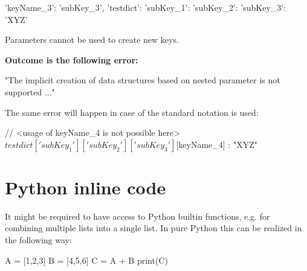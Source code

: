 \begin{pythonlog}
{'keyName_3': 'subKey_3',
 'testdict': {'subKey_1': {'subKey_2': {'subKey_3': 'XYZ'}}}}
\end{pythonlog}

\vspace{2ex}

Parameters cannot be used to create new keys.


\vspace{2ex}

\textbf{Outcome is the following error:}

\begin{pythonlog}
"The implicit creation of data structures based on nested parameter is not supported ..."
\end{pythonlog}

The same error will happen in case of the standard notation is used:

\begin{pythoncode}
{
   // <usage of keyName\_4 is not possible here>
   ${testdict}['subKey_1']['subKey_2']['subKey_3'][${keyName_4}] : "XYZ"
}
\end{pythoncode}


\newpage

\section{Python inline code}

It might be required to have access to Python builtin functions, e.g. for combining multiple lists into a single list.
In pure Python this can be realized in the following way:

\begin{pythoncode}
A = [1,2,3]
B = [4,5,6]
C = A + B
print(C)
\end{pythoncode}

